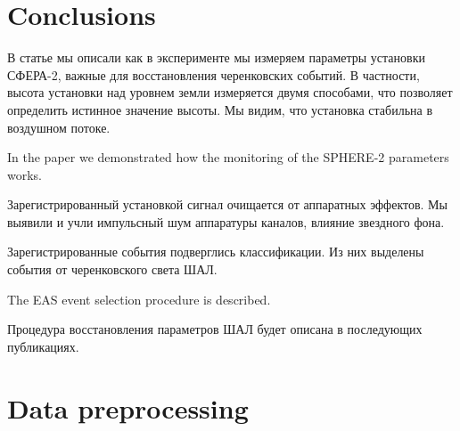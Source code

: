 \documentclass[final,5p,times,twocolumn]{elsarticle}
\begin{document}
\section{Conclusions \label{sect:conclusions}}

{
\Russian

В статье мы описали как в эксперименте мы измеряем параметры установки  СФЕРА-2, важные для восстановления черенковских событий.  В частности, высота установки над уровнем земли измеряется двумя способами, что позволяет определить истинное значение высоты. Мы видим, что установка стабильна в воздушном потоке.} 
In the paper we demonstrated how the monitoring of the SPHERE-2 parameters works. 

{
\Russian
Зарегистрированный установкой сигнал очищается от аппаратных эффектов. Мы выявили и учли импульсный шум аппаратуры каналов, влияние звездного фона. 

Зарегистрированные события подверглись классификации. Из них выделены события от черенковского света ШАЛ. }The EAS event selection procedure is described.

{
\Russian
Процедура восстановления параметров ШАЛ будет описана в последующих публикациях.
}




\appendix



\section{Data preprocessing\label{sect:preprocessing}}
\end{document}
